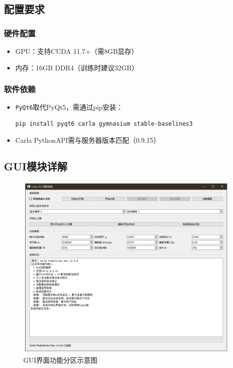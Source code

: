 \subsection{配置要求}
\subsubsection*{硬件配置}
\begin{itemize}
\item GPU：支持CUDA 11.7+（需8GB显存）
\item 内存：16GB DDR4（训练时建议32GB）
\end{itemize}

\subsubsection*{软件依赖}
\begin{itemize}
\item \texttt{PyQt6}取代PyQt5，需通过pip安装：
\begin{lstlisting}[language=bash]
pip install pyqt6 carla gymnasium stable-baselines3
\end{lstlisting}
\item Carla PythonAPI需与服务器版本匹配（0.9.15）
\end{itemize}

\subsection{GUI模块详解}
\begin{figure}[H]
\centering
\includegraphics[width=1\textwidth]{images/gui_layout.pdf}
\caption{GUI界面功能分区示意图}
\label{fig:gui-layout}
\end{figure}

